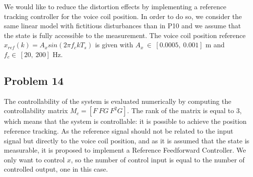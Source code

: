 We would like to reduce the distortion effects by implementing a reference tracking controller for the voice coil position. In order to do so, we consider the same linear model with fictitious disturbances than in P10 and we assume that the state is fully accessible to the measurement. The voice coil position reference $x_{ref}(k) = A_x sin(2\pi f_c k T_s)$ is given with $A_x \ \in \ [0.0005,\ 0.001]$ m and $f_c \in \ [20,\ 200]$ Hz.

\subsection*{Problem 14}

The controllability of the system is evaluated numerically by computing the controllability matrix $M_c = [F \ FG \ F^2G]$. The rank of the matrix is equal to 3, which means that the system is controllable: it is possible to achieve the position reference tracking. As the reference signal should not be related to the input signal but directly to the voice coil position, and as it is assumed that the state is measurable, it is proposed to implement a Reference Feedforward Controller. We only want to control $x$, so the number of control input is equal to the number of controlled output, one in this case. 